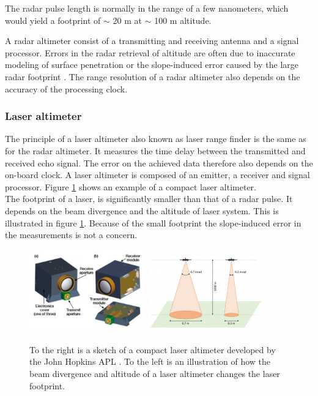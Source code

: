 The radar pulse length is normally in the range of a few nanometers, which would yield a footprint of $\sim$ 20 m at $\sim$ 100 m altitude. 

A radar altimeter consist of a transmitting and receiving antenna and a signal processor. Errors in the radar retrieval of altitude are often due to inaccurate modeling of surface penetration or the slope-induced error caused by the large radar footprint \cite{icealti}. The range resolution of a radar altimeter also depends on the accuracy of the processing clock.


\subsubsection{Laser altimeter}

The principle of a laser altimeter also known as laser range finder is the same as for the radar altimeter. It measures the time delay between the transmitted and received echo signal. The error on the achieved data therefore also depends on the on-board clock. A laser altimeter is composed of an emitter, a receiver and signal processor. Figure \ref{alti} shows an example of a compact laser altimeter.\\

The footprint of a laser, is significantly smaller than that of a radar pulse. It depends on the beam divergence and the altitude of laser system. This is illustrated in figure \ref{alti}. Because of the small footprint the slope-induced error in the measurements is not a concern.

\begin{figure}[htb]
\begin{center}
\includegraphics[width=0.45\textwidth]{figures/navtheory/CLA}
\includegraphics[width=0.45\textwidth]{figures/navtheory/lidarfoot}
\caption{To the right is a sketch of a compact laser altimeter developed by the John Hopkins APL \cite{APLCLA}. To the left is an illustration of how the beam divergence and altitude of a laser altimeter changes the laser footprint.\cite{footprint}}
\label{alti}
\end{center}
\end{figure}

